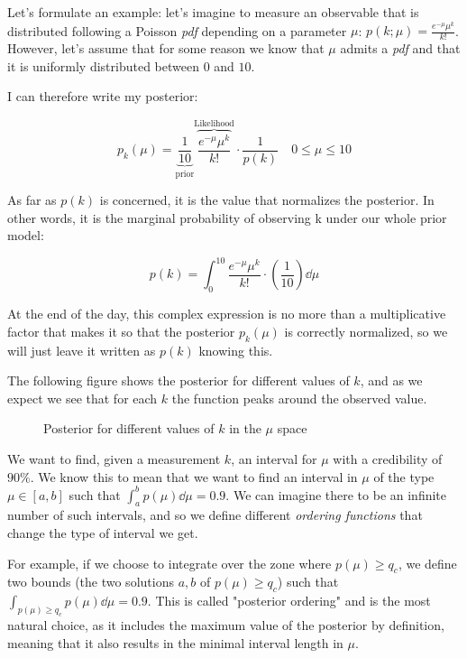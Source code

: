 \begin{example}
	Let's formulate an example: let's imagine to measure an observable that is distributed following a Poisson \emph{pdf} depending on a parameter $\mu$: $p(k;\mu) = \frac{e^{-\mu}\mu^k}{k!}$. However, let's assume that for some reason we know that $\mu$ admits a \emph{pdf} and that it is uniformly distributed between $0$ and $10$. 
	
	I can therefore write my posterior:
	
	\[
	p_k(\mu) = \underbrace{\frac{1}{10}}_{\text{prior}}\overbrace{\frac{e^{-\mu}\mu^k}{k!}}^{\text{Likelihood}}\cdot\frac{1}{p(k)}\quad 0\leq\mu\leq10
	\]
	
	As far as $p(k)$ is concerned, it is the value that normalizes the posterior. In other words, it is the marginal probability of observing k under our whole prior model:
	
	\[
	p(k) = \int_0^{10} \frac{e^{-\mu}\mu^k}{k!}\cdot\left(\frac{1}{10}\right)\dd\mu
	\]
	
	At the end of the day, this complex expression is no more than a multiplicative factor that makes it so that the posterior $p_k(\mu)$ is correctly normalized, so we will just leave it written as $p(k)$ knowing this.
	
	The following figure shows the posterior for different values of $k$, and as we expect we see that for each $k$ the function peaks around the observed value.
	
	\begin{figure}[H]
		\centering
		
		\caption{Posterior for different values of $k$ in the $\mu$ space}
		\label{fig:bayes_posterior}
	\end{figure}
	
	We want to find, given a measurement $k$, an interval for $\mu$ with a credibility of $90\%$. We know this to mean that we want to find an interval in $\mu$ of the type $\mu\in[a,b]$ such that $\int_a^bp(\mu)\dd \mu= 0.9$. We can imagine there to be an infinite number of such intervals, and so we define different \emph{ordering functions} that change the type of interval we get.
	
	For example, if we choose to integrate over the zone where $p(\mu)\geq q_c$, we define two bounds (the two solutions $a,b$ of $p(\mu)\geq q_c$) such that $\int_{p(\mu)\geq q_c}p(\mu)\dd \mu = 0.9$. This is called "posterior ordering" and is the most natural choice, as it includes the maximum value of the posterior by definition, meaning that it also results in the minimal interval length in $\mu$.
	

\end{example}
